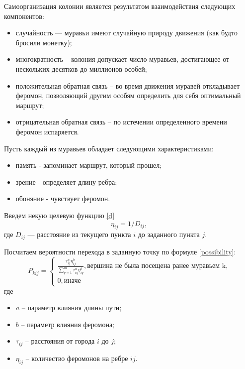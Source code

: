 Самоорганизация колонии является результатом взаимодействия следующих компонентов:
\begin{itemize}
	\item случайность — муравьи имеют случайную природу движения (как будто бросили монетку);
	\item многократность -- колония допускает число муравьев, достигающее от нескольких десятков до миллионов особей;
	\item положительная обратная связь -- во время движения муравей откладывает феромон, позволяющий другим особям определить для себя оптимальный маршрут;
	\item отрицательная обратная связь -- по истечении определенного времени феромон испаряется.
\end{itemize}

Пусть каждый из муравьев обладает следующими характеристиками:
\begin{itemize}
	\item память - запоминает маршрут, который прошел;
	\item зрение - определяет длину ребра;
	\item обоняние - чувствует феромон.
\end{itemize}

Введем некую целевую функцию \eqref{d}
\begin{equation}
	\label{d}
	\eta_{ij} = 1 / D_{ij},
\end{equation}
где $D_{ij}$ — расстояние из текущего пункта $i$ до заданного пункта $j$.


Посчитаем вероятности перехода в заданную точку по формуле \eqref{possibility}:
\begin{equation}
	\label{possibility}
	P_{kij} = \begin{cases}
		\frac{\tau_{ij}^a\eta_{ij}^b}{\sum_{q=1}^m \tau^a_{iq}\eta^b_{iq}}, \textrm{вершина не была посещена ранее муравьем k,} \\
		0, \textrm{иначе}
	\end{cases}
\end{equation}
где 
\begin{itemize}
	\item $a$ -- параметр влияния длины пути;
	\item $b$ -- параметр влияния феромона;
	\item $\tau_{ij}$ -- расстояния от города $i$ до $j$;
	\item $\eta_{ij}$ -- количество феромонов на ребре $ij$.
\end{itemize}


